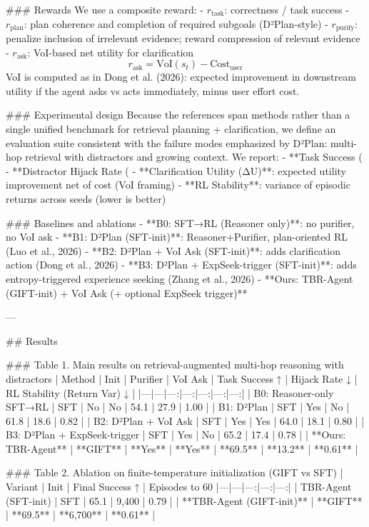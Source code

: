 ### Rewards  
We use a composite reward:  
- \(r_{\text{task}}\): correctness / task success  
- \(r_{\text{plan}}\): plan coherence and completion of required subgoals (D²Plan-style)  
- \(r_{\text{purify}}\): penalize inclusion of irrelevant evidence; reward compression of relevant evidence  
- \(r_{\text{ask}}\): VoI-based net utility for clarification  
  \[
  r_{\text{ask}} = \text{VoI}(s_t) - \text{Cost}_{\text{user}}
  \]
VoI is computed as in Dong et al. (2026): expected improvement in downstream utility if the agent asks vs acts immediately, minus user effort cost.

### Experimental design  
Because the references span methods rather than a single unified benchmark for retrieval planning + clarification, we define an evaluation suite consistent with the failure modes emphasized by D²Plan: multi-hop retrieval with distractors and growing context. We report:  
- **Task Success (%
- **Distractor Hijack Rate (%
- **Clarification Utility (ΔU)**: expected utility improvement net of cost (VoI framing)  
- **RL Stability**: variance of episodic returns across seeds (lower is better)  

### Baselines and ablations  
- **B0: SFT→RL (Reasoner only)**: no purifier, no VoI ask  
- **B1: D²Plan (SFT-init)**: Reasoner+Purifier, plan-oriented RL (Luo et al., 2026)  
- **B2: D²Plan + VoI Ask (SFT-init)**: adds clarification action (Dong et al., 2026)  
- **B3: D²Plan + ExpSeek-trigger (SFT-init)**: adds entropy-triggered experience seeking (Zhang et al., 2026)  
- **Ours: TBR-Agent (GIFT-init) + VoI Ask (+ optional ExpSeek trigger)**  

---

## Results  

### Table 1. Main results on retrieval-augmented multi-hop reasoning with distractors  
| Method | Init | Purifier | VoI Ask | Task Success ↑ | Hijack Rate ↓ | RL Stability (Return Var) ↓ |
|---|---|---:|---:|---:|---:|---:|
| B0: Reasoner-only SFT→RL | SFT | No | No | 54.1 | 27.9 | 1.00 |
| B1: D²Plan | SFT | Yes | No | 61.8 | 18.6 | 0.82 |
| B2: D²Plan + VoI Ask | SFT | Yes | Yes | 64.0 | 18.1 | 0.80 |
| B3: D²Plan + ExpSeek-trigger | SFT | Yes | No | 65.2 | 17.4 | 0.78 |
| **Ours: TBR-Agent** | **GIFT** | **Yes** | **Yes** | **69.5** | **13.2** | **0.61** |

### Table 2. Ablation on finite-temperature initialization (GIFT vs SFT)  
| Variant | Init | Final Success ↑ | Episodes to 60%
|---|---|---:|---:|---:|
| TBR-Agent (SFT-init) | SFT | 65.1 | 9,400 | 0.79 |
| **TBR-Agent (GIFT-init)** | **GIFT** | **69.5** | **6,700** | **0.61** |

